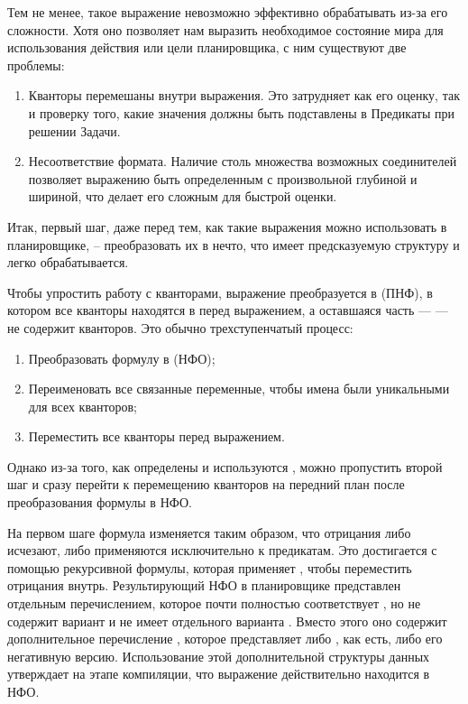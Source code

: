 Тем не менее, такое выражение невозможно эффективно обрабатывать из-за его сложности.
Хотя оно позволяет нам выразить необходимое состояние мира для использования действия
или цели планировщика, с ним существуют две проблемы:

\begin{enumerate}
  \item Кванторы перемешаны внутри выражения.
    Это затрудняет как его оценку, так и
    проверку того, какие значения должны быть подставлены в Предикаты
    при решении Задачи.
  \item Несоответствие формата.
    Наличие столь множества возможных соединителей
    позволяет выражению быть определенным с произвольной
    глубиной и шириной, что делает его сложным для быстрой оценки.
\end{enumerate}

Итак, первый шаг, даже перед тем, как такие выражения можно использовать
в планировщике, -- преобразовать их в нечто,
что имеет предсказуемую структуру и
легко обрабатывается.

Чтобы упростить работу с кванторами,
выражение преобразуется в  (ПНФ),
в котором все кванторы находятся в  перед выражением,
а оставшаяся часть ---  --- не содержит кванторов.
Это обычно трехступенчатый процесс:

\begin{enumerate}
  \item Преобразовать формулу в  (НФО);
  \item Переименовать все связанные переменные,
    чтобы имена были уникальными для всех кванторов;
  \item Переместить все кванторы перед выражением.
\end{enumerate}

Однако из-за того, как определены и используются ,
можно пропустить второй шаг
и сразу перейти к перемещению кванторов на передний план после преобразования формулы в НФО.

На первом шаге формула изменяется таким образом,
что отрицания либо исчезают, либо применяются исключительно к предикатам.
Это достигается с помощью рекурсивной формулы,
которая применяет , чтобы переместить отрицания внутрь.
Результирующий НФО в планировщике представлен отдельным перечислением,
которое почти полностью соответствует , но не содержит
вариант  и не имеет отдельного варианта .
Вместо этого оно содержит дополнительное перечисление ,
которое представляет либо , как есть, либо его негативную версию.
Использование этой дополнительной структуры данных утверждает на этапе компиляции,
что выражение действительно находится в НФО.

